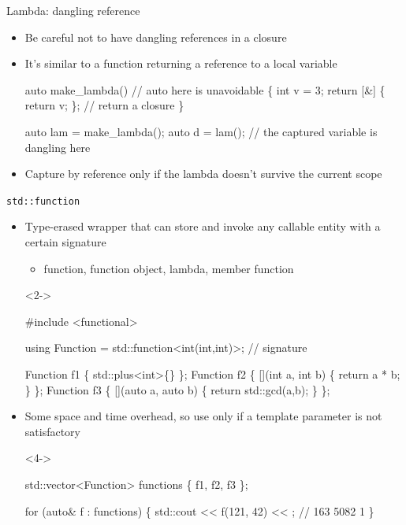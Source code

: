 \begin{frame}[fragile]{Lambda: dangling reference}

  \begin{itemize}
  \item Be careful not to have dangling references in a closure
  \item It's similar to a function returning a reference to a local variable

  \begin{codeblock}
auto make\_lambda() // auto here is unavoidable
\{
  int v = 3;
  return [\alert{&}] \{ return v; \}; // return a closure
\}

auto lam = make\_lambda();
auto d = lam(); // the captured variable is dangling here\end{codeblock}

  \item<2-> Capture by reference only if the lambda doesn't survive the current
    scope
  \end{itemize}

\end{frame}

\begin{frame}[fragile]{\texttt{std::function}}

  \begin{itemize}
  \item Type-erased wrapper that can store and invoke any callable entity with a
    certain signature
    \begin{itemize}
    \item function, function object, lambda, member function
    \end{itemize}

    \begin{codeblock}<2->{
#include <functional>

using Function = std::function<\alert{int(int,int)}>; // \alert{signature}

Function f1 \{ std::plus<int>\{\} \};
Function f2 \{ [](int a, int b) \{ return a * b; \} \};
Function f3 \{ [](auto a, auto b) \{ return std::gcd(a,b); \} \};}\end{codeblock}

  \item<3-> Some space and time overhead, so use only if a template parameter is
    not satisfactory
    \begin{codeblock}<4->{
std::vector<Function> functions \{ f1, f2, f3 \};

for (auto& f : functions) \{
  std::cout << f(121, 42) << \bslashn; // 163 5082 1
\}}\end{codeblock}

  \end{itemize}

\end{frame}
